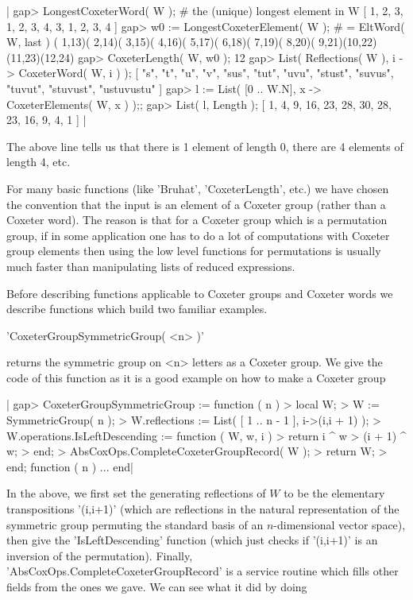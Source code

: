 |    gap> LongestCoxeterWord( W );  # the (unique) longest element in W
    [ 1, 2, 3, 1, 2, 3, 4, 3, 1, 2, 3, 4 ]
    gap> w0 := LongestCoxeterElement( W ); # = EltWord( W, last )
    ( 1,13)( 2,14)( 3,15)( 4,16)( 5,17)( 6,18)( 7,19)( 8,20)( 9,21)(10,22)
    (11,23)(12,24)
    gap> CoxeterLength( W, w0 );
    12
    gap> List( Reflections( W ), i -> CoxeterWord( W, i ) );
    [ "s", "t", "u", "v", "sus", "tut", "uvu", "stust", "suvus", "tuvut",
      "stuvust", "ustuvustu" ]
    gap> l := List( [0 .. W.N], x -> CoxeterElements( W, x ) );;
    gap> List( l, Length );
    [ 1, 4, 9, 16, 23, 28, 30, 28, 23, 16, 9, 4, 1 ] |

The above line tells us that there is 1 element of length 0, there are 4
elements of length 4, etc.

For  many basic  functions (like  'Bruhat', 'CoxeterLength',  etc.) we have
chosen  the convention  that the  input is  an element  of a  Coxeter group
(rather  than a Coxeter word). The reason is that for a Coxeter group which
is  a permutation  group, if  in some  application one  has to  do a lot of
computations  with Coxeter group  elements then using  the low level {\GAP}
functions  for permutations is usually  much faster than manipulating lists
of reduced expressions.

Before  describing functions  applicable to  Coxeter groups  and Coxeter
words we describe functions which  build two familiar examples.


'CoxeterGroupSymmetricGroup( <n> )'

returns the symmetric group on <n> letters as a Coxeter group.   We  give
the  code  of  this  function  as  it  is a good example on how to make a
Coxeter group\:

|    gap> CoxeterGroupSymmetricGroup := function ( n )
    > local  W;
    > W := SymmetricGroup( n );
    > W.reflections := List( [ 1 .. n - 1 ], i->(i,i + 1) );
    > W.operations.IsLeftDescending := function ( W, w, i )
    >       return i ^ w > (i + 1) ^ w;
    >   end;
    > AbsCoxOps.CompleteCoxeterGroupRecord( W );
    > return W;
    > end;
    function ( n ) ... end|

In   the   above,  we   first   set   the  generating   reflections   of
$W$   to  be   the  elementary   transpositions  '(i,i+1)'   (which  are
reflections  in  the  natural  representation  of  the  symmetric  group
permuting  the  standard  basis  of an  $n$-dimensional  vector  space),
then   give  the   'IsLeftDescending'   function   (which  just   checks
if   '(i,i+1)'   is  an   inversion   of   the  permutation).   Finally,
'AbsCoxOps.CompleteCoxeterGroupRecord' is a  service routine which fills
other fields from the ones we gave. We can see what it did by doing\:

